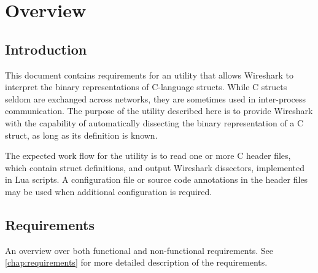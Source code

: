 
\chapter{Overview}

\section{Introduction}
This document contains requirements for an utility that allows Wireshark to
interpret the binary representations of C-language structs. While C structs
seldom are exchanged across networks, they are sometimes used in inter-process
communication. The purpose of the utility described here is to provide
Wireshark with the capability of automatically dissecting the binary
representation of a C struct, as long as its definition is known.

The expected work flow for the utility is to read one or more C header files,
which contain struct definitions, and output Wireshark dissectors, implemented
in Lua scripts. A configuration file or source code annotations in the header
files may be used when additional configuration is required.

\section{Requirements}
An overview over both functional and non-functional requirements.
See \autoref{chap:requirements} for more detailed description of the requirements.

